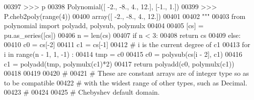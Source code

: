 \begin{DoxyCode}
00397 \textcolor{stringliteral}{    >>> p}
00398 \textcolor{stringliteral}{    Polynomial([ -2.,  -8.,   4.,  12.], [-1.,  1.])}
00399 \textcolor{stringliteral}{    >>> P.cheb2poly(range(4))}
00400 \textcolor{stringliteral}{    array([ -2.,  -8.,   4.,  12.])}
00401 \textcolor{stringliteral}{}
00402 \textcolor{stringliteral}{    """}
00403     \textcolor{keyword}{from} polynomial \textcolor{keyword}{import} polyadd, polysub, polymulx
00404 
00405     [cs] = pu.as\_series([cs])
00406     n = len(cs)
00407     \textcolor{keywordflow}{if} n < 3:
00408         \textcolor{keywordflow}{return} cs
00409     \textcolor{keywordflow}{else}:
00410         c0 = cs[-2]
00411         c1 = cs[-1]
00412         \textcolor{comment}{# i is the current degree of c1}
00413         \textcolor{keywordflow}{for} i \textcolor{keywordflow}{in} range(n - 1, 1, -1) :
00414             tmp = c0
00415             c0 = polysub(cs[i - 2], c1)
00416             c1 = polyadd(tmp, polymulx(c1)*2)
00417         \textcolor{keywordflow}{return} polyadd(c0, polymulx(c1))
00418 
00419 
00420 \textcolor{comment}{#}
00421 \textcolor{comment}{# These are constant arrays are of integer type so as to be compatible}
00422 \textcolor{comment}{# with the widest range of other types, such as Decimal.}
00423 \textcolor{comment}{#}
00424 
00425 \textcolor{comment}{# Chebyshev default domain.}
\end{DoxyCode}
\hypertarget{namespacepyneb_1_1utils_1_1chebyshev_a06a85eb72ae35925336a6b550dec3f02}{}
